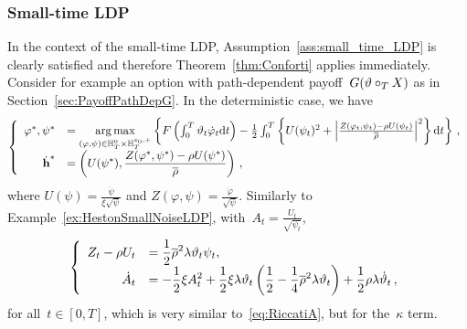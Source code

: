 \subsubsection{Small-time LDP}
In the context of the small-time LDP,  Assumption~\ref{ass:small_time_LDP} is clearly satisfied and therefore Theorem~\ref{thm:Conforti} applies immediately.
Consider for example an option with path-dependent payoff~$G(\vartheta\circ_{T} X)$ 
as in Section~\ref{sec:PayoffPathDepG}.
In the deterministic case, we have
\begin{equation*}
\left\{
\begin{array}{rl}
\varphi^{*},\psi^{*}
& = \operatorname*{arg\,max}\limits_{(\varphi,\psi) \in \mathbb{H}_T^0\times \mathbb{H}_T^{v_0,+}} \left\{F\left(\int_0^T\vartheta_t \dot{\varphi}_t \mathrm{d} t\right) - \frac{1}{2}\int_0^T \left\{U(\psi_t)^2 + \left|\frac{Z(\varphi_t,\psi_t) - \rho U(\psi_t)}{\overline{\rho}}\right|^2\right\}\mathrm{d} t\right\}\,, \\
\dot{\boldsymbol{\mathrm{h}}}^{*} & = \displaystyle 
\left(U(\psi^{*}),  \frac{Z(\varphi^{*},\psi^{*}) - \rho U(\psi^{*})}{\overline{\rho}}\right)\,,
\end{array}
\right.
\end{equation*}
where
$U(\psi) = \frac{\dot{\psi}}{\xi \sqrt{\psi}}$
and
$Z(\varphi,\psi) = \frac{\dot{\varphi}}{\sqrt{\psi}}$.
Similarly to Example~\ref{ex:HestonSmallNoiseLDP}, 
with~$A_t = \frac{U_t}{\sqrt{\psi_t}}$,
\begin{equation*}
\left\{
\begin{array}{rl}
\displaystyle Z_t - \rho U_t &= \displaystyle \frac{1}{2} \overline{\rho}^2 \lambda \vartheta_t \psi_t,\\
\displaystyle \dot{A}_t
&= \displaystyle -\frac{1}{2}\xi A_t^2 + \frac{1}{2}\xi \lambda \vartheta_t \left(\frac{1}{2} - \frac{1}{4}\overline{\rho}^2\lambda\vartheta_t \right) + \frac{1}{2}\rho\lambda\dot{\vartheta}_t\,,
\end{array}
\right.
\end{equation*}
for all~$t\in[0,T]$,
which is very similar to~\eqref{eq:RiccatiA}, 
but for the~$\kappa$ term.
